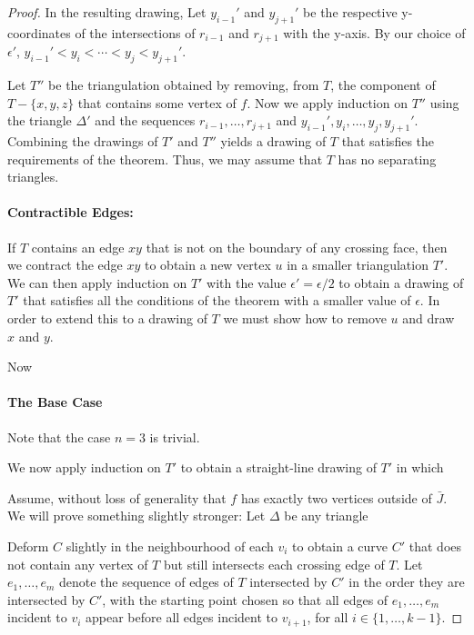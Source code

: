 \documentclass{patmorin}
\begin{document}
\begin{proof}
   In the resulting drawing, Let $y_{i-1}'$ and $y_{j+1}'$ be
   the respective y-coordinates of the intersections of $r_{i-1}$
   and $r_{j+1}$ with the y-axis.  By our choice of $\epsilon'$,
   $y_{i-1}'<y_i<\cdots<y_j<y_{j+1}'$.

   Let $T''$ be the triangulation obtained by removing, from $T$, the
   component of $T-\{x,y,z\}$ that contains some vertex of $f$.  Now we
   apply induction on $T''$ using the triangle $\Delta'$ and the sequences
   $r_{i-1},\ldots,r_{j+1}$ and $y_{i-1}',y_i,\ldots,y_{j},y_{j+1}'$.
   Combining the drawings of $T'$ and $T''$ yields a drawing of $T$
   that satisfies the requirements of the theorem.  Thus, we may assume
   that $T$ has no separating triangles.

   \paragraph{Contractible Edges:}
   If $T$ contains an edge $xy$ that is not on the boundary of any
   crossing face, then we contract the edge $xy$ to obtain a new vertex
   $u$ in a smaller triangulation $T'$.   We can then apply induction
   on $T'$ with the value $\epsilon'=\epsilon/2$ to obtain a drawing
   of $T'$ that satisfies all the conditions of the theorem with a smaller value of $\epsilon$.  In order
   to extend this to a drawing of $T$ we must show how to remove $u$
   and draw $x$ and $y$.

   Now


   \paragraph{The Base Case}
   Note that the case $n=3$ is trivial.

   We now apply
   induction on $T'$ to obtain a straight-line drawing of $T'$ in which




   Assume, without loss of generality that $f$ has exactly two vertices outside of $\bar{J}$.  We will prove something slightly stronger:  Let $\Delta$ be any triangle 

    

   Deform $C$ slightly in the neighbourhood of each $v_i$ to obtain a
   curve $C'$ that does not contain any vertex of $T$ but still intersects
   each crossing edge of $T$.  Let $e_1,\ldots,e_m$ denote the sequence
   of edges of $T$ intersected by $C'$ in the order they are intersected
   by $C'$, with the starting point chosen so that all edges of
   $e_1,\ldots,e_m$ incident to $v_i$ appear before all edges incident to
   $v_{i+1}$, for all $i\in\{1,\ldots,k-1\}$.


\end{proof}
\end{document}
